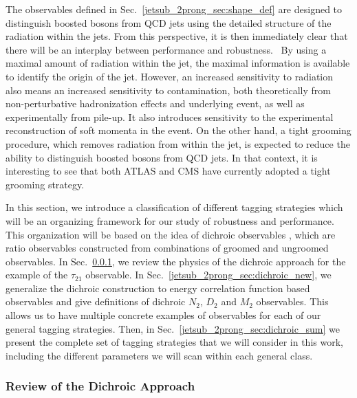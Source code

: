 \documentclass[11pt]{cernrep}
\begin{document}
The observables defined in Sec.~\ref{jetsub_2prong_sec:shape_def} are designed to
distinguish boosted bosons from QCD jets using the detailed structure
of the radiation within the jets.
%
From this perspective, it is then
immediately clear that there will be an interplay between performance
and robustness.\
%
By using a maximal amount of radiation within the jet,
the maximal information is available to identify the origin of the
jet.
%
However, an increased sensitivity to radiation also means an
increased sensitivity to contamination, both theoretically from
non-perturbative hadronization effects and underlying event, as well
as experimentally from pile-up.
%
It also introduces sensitivity to the
experimental reconstruction of soft momenta in the event.
% 
On the other
hand, a tight grooming procedure, which removes radiation from within
the jet, is expected to reduce the ability to distinguish boosted
bosons from QCD jets.
%
In that context, it is interesting to see that both ATLAS and CMS
have currently adopted a tight grooming strategy.

In this section, we introduce a classification of different tagging strategies which will be an organizing framework for our study of robustness and performance.
%
This organization will be based on the idea of dichroic observables \cite{Salam:2016yht}, which are ratio observables constructed from combinations of groomed and ungroomed observables.
%
In Sec.~\ref{jetsub_2prong_sec:dichroic}, we review the physics of the dichroic approach for the example of the $\tau_{21}$ observable.
%
In Sec.~\ref{jetsub_2prong_sec:dichroic_new}, we generalize the dichroic construction to energy correlation function based observables and give definitions of dichroic $N_2$, $D_2$ and $M_2$ observables.
%
This allows us to have multiple concrete examples of observables for each of our general tagging strategies.
%
Then, in Sec.~\ref{jetsub_2prong_sec:dichroic_sum} we present the complete set of tagging strategies that we will consider in this work, including the different parameters we will scan within each general class.



\subsubsection{Review of the Dichroic Approach}\label{jetsub_2prong_sec:dichroic}
\end{document}
